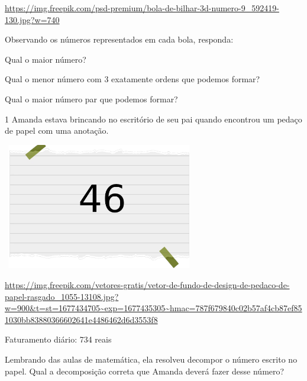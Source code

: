 \url{https://img.freepik.com/psd-premium/bola-de-bilhar-3d-numero-9_592419-130.jpg?w=740}


Observando os números representados em cada bola, responda:

\begin{escolha}

  \item
  Qual o maior número?

  \item
  Qual o menor número com 3 exatamente ordens que podemos formar?

\item
  Qual o maior número par que podemos formar?

\end{escolha}



\num{1} Amanda estava brincando no escritório de seu pai quando
encontrou um pedaço de papel com uma anotação.

\includegraphics[width=3.30833in,height=2.17391in]{media/image2.png}

\url{https://img.freepik.com/vetores-gratis/vetor-de-fundo-de-design-de-pedaco-de-papel-rasgado_1055-13108.jpg?w=900\&t=st=1677434705~exp=1677435305~hmac=787f679840c02b57af4cb87ef851030bb83880366602641e4486462d6d3553f8}


Faturamento diário: 734 reais

Lembrando das aulas de matemática, ela resolveu decompor o número escrito
no papel. Qual a decomposição correta que Amanda deverá fazer desse
número?

